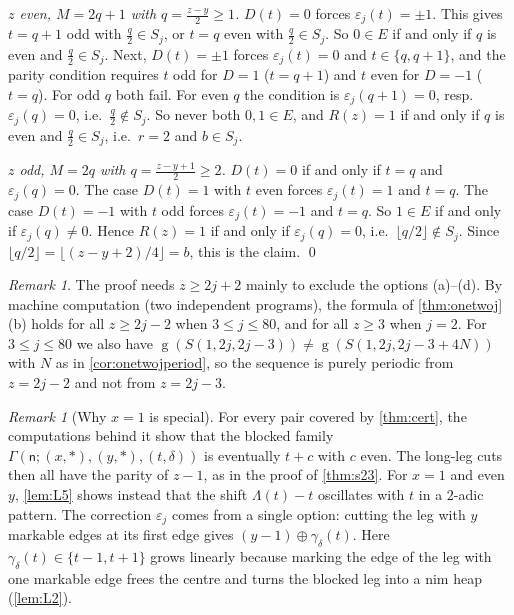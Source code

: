 \documentclass[11pt]{amsart}
\theoremstyle{definition}
\theoremstyle{remark}
\newtheorem{remark}[theorem]{Remark}
\newcommand{\gv}{\operatorname{g}}           %
\newcommand{\sn}{\mathsf{n}}
\newcommand{\Sp}{S}
\newcommand{\free}{\ast}
\begin{document}
\emph{$z$ even, $M=2q+1$ with $q=\frac{z-y}2\ge1$.} $D(t)=0$ forces $\varepsilon_j(t)=\pm1$. This gives $t=q+1$ odd with $\frac q2\in S_j$, or $t=q$ even with $\frac q2\in S_j$. So $0\in E$ if and only if $q$ is even and $\frac q2\in S_j$. Next, $D(t)=\pm1$ forces $\varepsilon_j(t)=0$ and $t\in\{q,q+1\}$, and the parity condition requires $t$ odd for $D=1$ ($t=q+1$) and $t$ even for $D=-1$ ($t=q$). For odd $q$ both fail. For even $q$ the condition is $\varepsilon_j(q+1)=0$, resp.\ $\varepsilon_j(q)=0$, i.e.\ $\frac q2\notin S_j$. So never both $0,1\in E$, and $R(z)=1$ if and only if $q$ is even and $\frac q2\in S_j$, i.e.\ $r=2$ and $b\in S_j$.

\emph{$z$ odd, $M=2q$ with $q=\frac{z-y+1}2\ge2$.} $D(t)=0$ if and only if $t=q$ and $\varepsilon_j(q)=0$. The case $D(t)=1$ with $t$ even forces $\varepsilon_j(t)=1$ and $t=q$. The case $D(t)=-1$ with $t$ odd forces $\varepsilon_j(t)=-1$ and $t=q$. So $1\in E$ if and only if $\varepsilon_j(q)\neq0$. Hence $R(z)=1$ if and only if $\varepsilon_j(q)=0$, i.e.\ $\lfloor q/2\rfloor\notin S_j$. Since $\lfloor q/2\rfloor=\lfloor (z-y+2)/4\rfloor=b$, this is the claim.
\qed

\begin{remark}\label{rem:onetwojwindow}
The proof needs $z\ge 2j+2$ mainly to exclude the options (a)--(d). By machine computation (two independent programs), the formula of \cref{thm:onetwoj}(b) holds for all $z\ge 2j-2$ when $3\le j\le 80$, and for all $z\ge 3$ when $j=2$. For $3\le j\le 80$ we also have $\gv(\Sp(1,2j,2j-3))\ne\gv(\Sp(1,2j,2j-3+4N))$ with $N$ as in \cref{cor:onetwojperiod}, so the sequence is purely periodic from $z=2j-2$ and not from $z=2j-3$.
\end{remark}

\begin{remark}[Why $x=1$ is special]\label{rem:whyone}
For every pair covered by \cref{thm:cert}, the computations behind it show that the blocked family $\Gamma(\sn;(x,\free),(y,\free),(t,\delta))$ is eventually $t+c$ with $c$ even. The long-leg cuts then all have the parity of $z-1$, as in the proof of \cref{thm:s23}. For $x=1$ and even $y$, \cref{lem:L5} shows instead that the shift $\Lambda(t)-t$ oscillates with $t$ in a $2$-adic pattern. The correction $\varepsilon_j$ comes from a single option: cutting the leg with $y$ markable edges at its first edge gives $(y-1)\oplus\gamma_\delta(t)$. Here $\gamma_\delta(t)\in\{t-1,t+1\}$ grows linearly because marking the edge of the leg with one markable edge frees the centre and turns the blocked leg into a nim heap (\cref{lem:L2}).
\end{remark}
\end{document}
